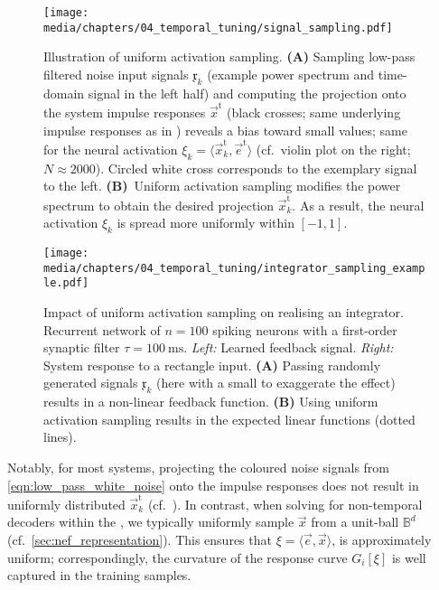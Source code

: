 \begin{figure}
	\centering
	\texttt{[image: media/chapters/04\_temporal\_tuning/signal\_sampling.pdf]}%
	{\label{fig:signal_sampling_a}}%
	{\label{fig:signal_sampling_b}}%
	\caption[Illustration of uniform activation sampling]{Illustration of uniform activation sampling.
	\textbf{(A)} Sampling low-pass filtered noise input signals $\mathfrak{x}_k$ (example power spectrum and time-domain signal in the left half) and computing the projection onto the \LTI system impulse responses $\vec{x}^\mathrm{t}$ (black crosses; same underlying impulse responses as in ) reveals a bias toward small values; same for the neural activation $\xi_k = \langle \vec{x}^\mathrm{t}_k, \vec{e}^\mathrm{t} \rangle$ (cf.~violin plot on the right; $N \approx 2000$).
	Circled white cross corresponds to the exemplary signal to the left.
	\textbf{(B)}~Uniform activation sampling modifies the power spectrum to obtain the desired projection $\vec{x}^\mathrm{t}_k$.
	As a result, the neural activation $\xi_k$ is spread more uniformly within $[-1, 1]$.
	}
	\label{fig:signal_sampling}
\end{figure}

\begin{figure}
	\centering
	\texttt{[image: media/chapters/04\_temporal\_tuning/integrator\_sampling\_example.pdf]}%
	\caption[Impact of uniform activation sampling on realising an integrator]{
	Impact of uniform activation sampling on realising an integrator.
	Recurrent network of $n = 100$ spiking \LIF neurons with a first-order synaptic filter $\tau = \SI{100}{\milli\second}$.
	\emph{Left:} Learned feedback signal.
	\emph{Right:} System response to a rectangle input.
	\textbf{(A)} Passing randomly generated signals $\mathfrak{x}_k$ (here with a small \RMS to exaggerate the effect) results in a non-linear feedback function.
	\textbf{(B)} Using uniform activation sampling results in the expected linear functions (dotted lines).
	}
	\label{fig:signal_sampling_weights}
\end{figure}

Notably, for most \LTI systems, projecting the coloured noise signals from \cref{eqn:low_pass_white_noise} onto the impulse responses does not result in uniformly distributed $\vec x^\mathrm{t}_k$ (cf.~).
In contrast, when solving for non-temporal decoders within the \NEF, we typically uniformly sample $\vec x$ from a unit-ball $\mathbb{B}^d$ (cf.~\cref{sec:nef_representation}).
This ensures that $\xi = \langle \vec e, \vec x \rangle$, is approximately uniform; correspondingly, the curvature of the response curve $G_i[\xi]$ is well captured in the training samples.

